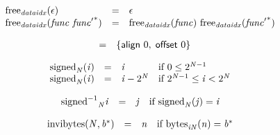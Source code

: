 $$
\begin{array}{@{}lcl@{}l@{}}
{\mathrm{free}}_{{\mathit{dataidx}}}(\epsilon) &=& \epsilon &  \\
{\mathrm{free}}_{{\mathit{dataidx}}}({\mathit{func}}~{{\mathit{func}'}^\ast}) &=& {\mathrm{free}}_{{\mathit{dataidx}}}({\mathit{func}})~{\mathrm{free}}_{{\mathit{dataidx}}}({{\mathit{func}'}^\ast}) &  \\
\end{array}
$$

\vspace{1ex}

\vspace{1ex}

$$
\begin{array}{@{}lcl@{}l@{}}
 &=& \{ \begin{array}[t]{@{}l@{}}
\mathsf{align}~0,\; \mathsf{offset}~0 \}\end{array} &  \\
\end{array}
$$

\vspace{1ex}

\vspace{1ex}

$$
\begin{array}{@{}lcl@{}l@{}}
{{\mathrm{signed}}}_{{\mathit{N}}}({\mathit{i}}) &=& {\mathit{i}} &\quad
  \mbox{if}~0 \leq {2^{{\mathit{N}} - 1}} \\
{{\mathrm{signed}}}_{{\mathit{N}}}({\mathit{i}}) &=& {\mathit{i}} - {2^{{\mathit{N}}}} &\quad
  \mbox{if}~{2^{{\mathit{N}} - 1}} \leq {\mathit{i}} < {2^{{\mathit{N}}}} \\
\end{array}
$$

$$
\begin{array}{@{}lcl@{}l@{}}
{{{{{\mathrm{signed}}^{{-1}}}}{}}_{{\mathit{N}}}}{{\mathit{i}}} &=& {\mathit{j}} &\quad
  \mbox{if}~{{\mathrm{signed}}}_{{\mathit{N}}}({\mathit{j}}) = {\mathit{i}} \\
\end{array}
$$

\vspace{1ex}

\vspace{1ex}

$$
\begin{array}{@{}lcl@{}l@{}}
{\mathrm{invibytes}}({\mathit{N}}, {{\mathit{b}}^\ast}) &=& {\mathit{n}} &\quad
  \mbox{if}~{{\mathrm{bytes}}}_{{{\mathit{i}}}{{\mathit{N}}}}({\mathit{n}}) = {{\mathit{b}}^\ast} \\
\end{array}
$$

